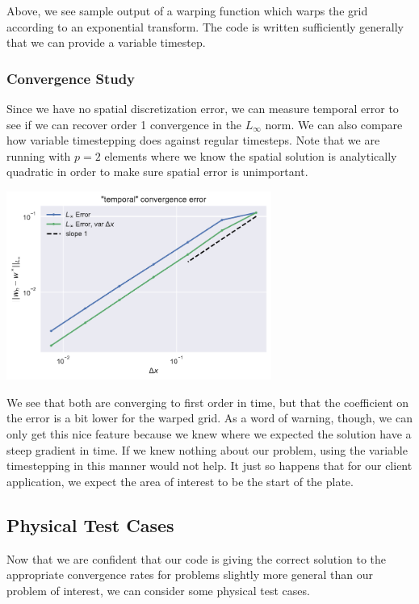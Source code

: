 \documentclass[10pt]{article}
\begin{document}
  Above, we see sample output of a warping function which warps the grid according to an exponential
  transform. The code is written sufficiently generally that we can provide a variable timestep. \\

  \subsubsection{Convergence Study}

  Since we have no spatial discretization error, we can measure temporal error to see if we can
  recover order 1 convergence in the $L_\infty$ norm. We can also compare how variable timestepping
  does against regular timesteps. Note that we are running with $p=2$ elements where we know the
  spatial solution is analytically quadratic in order to make sure spatial error is unimportant.

  \centerline{\includegraphics[width=0.65\textwidth]{img/temporal_convergence.pdf}}

  We see that both are converging to first order in time, but that the coefficient on the error is a
  bit lower for the warped grid. As a word of warning, though, we can only get this nice feature
  because we knew where we expected the solution have a steep gradient in time. If we knew nothing
  about our problem, using the variable timestepping in this manner would not help.  It just so
  happens that for our client application, we expect the area of interest to be the start of the
  plate.

  \subsection{Physical Test Cases}

  Now that we are confident that our code is giving the correct solution to the appropriate
  convergence rates for problems slightly more general than our problem of interest, we can consider
  some physical test cases. 
\end{document}
